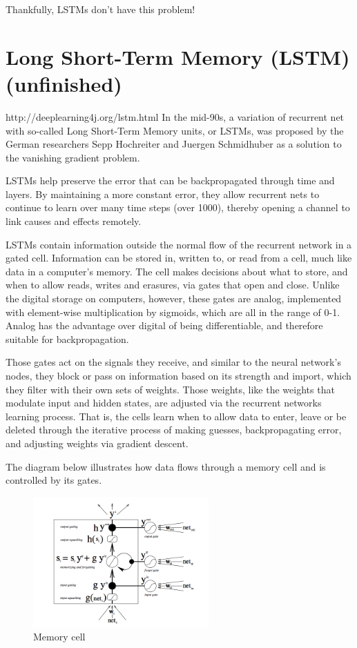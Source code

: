 {Thankfully, LSTMs don’t have this problem!


\section{Long Short-Term Memory (LSTM) (unfinished)}
http://deeplearning4j.org/lstm.html
In the mid-90s, a variation of recurrent net with so-called Long Short-Term Memory units, or LSTMs, was proposed by the German researchers Sepp Hochreiter and Juergen Schmidhuber as a solution to the vanishing gradient problem.

LSTMs help preserve the error that can be backpropagated through time and layers. By maintaining a more constant error, they allow recurrent nets to continue to learn over many time steps (over 1000), thereby opening a channel to link causes and effects remotely.

LSTMs contain information outside the normal flow of the recurrent network in a gated cell. Information can be stored in, written to, or read from a cell, much like data in a computer’s memory. The cell makes decisions about what to store, and when to allow reads, writes and erasures, via gates that open and close. Unlike the digital storage on computers, however, these gates are analog, implemented with element-wise multiplication by sigmoids, which are all in the range of 0-1. Analog has the advantage over digital of being differentiable, and therefore suitable for backpropagation.

Those gates act on the signals they receive, and similar to the neural network’s nodes, they block or pass on information based on its strength and import, which they filter with their own sets of weights. Those weights, like the weights that modulate input and hidden states, are adjusted via the recurrent networks learning process. That is, the cells learn when to allow data to enter, leave or be deleted through the iterative process of making guesses, backpropagating error, and adjusting weights via gradient descent.

The diagram below illustrates how data flows through a memory cell and is controlled by its gates.

\renewcommand{\figurename}{Abb.}
\begin{figure}[htp]
\centering
\includegraphics[width=0.60\textwidth]{pictures/gers_lstm.png}
\caption[Memory Cell]{Memory cell\protect\footnotemark}
\end{figure}

}
